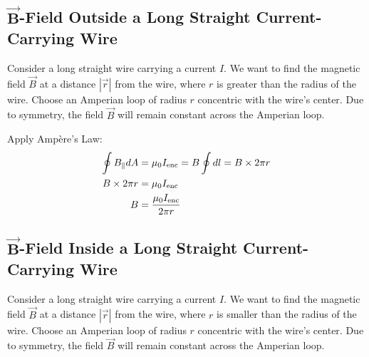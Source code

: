 \documentclass[12pt,b4paper]{article}
\begin{document}
\subsection{$\boldsymbol{\vec{B}}$-Field Outside a Long Straight Current-Carrying Wire}
Consider a long straight wire carrying a current $I$. We want to find the magnetic field $\vec{B}$ at a distance $|\vec{r}|$ from the wire, where $r$ is greater than the radius of the wire. Choose an Amperian loop of radius $r$ concentric with the wire's center. Due to symmetry, the field $\vec{B}$ will remain constant across the Amperian loop.

Apply Ampère's Law:
\begin{align}
    \oint B_\parallel dA&=\mu_0 I_\text{enc}=B\oint dl=B\times 2\pi r\notag\\
    B\times 2\pi r&=\mu_0 I_\text{enc}\notag\\
    B&=\frac{\mu_0 I_\text{enc}}{2\pi r}
\end{align}
\subsection{$\boldsymbol{\vec{B}}$-Field Inside a Long Straight Current-Carrying Wire}
Consider a long straight wire carrying a current $I$. We want to find the magnetic field $\vec{B}$ at a distance $|\vec{r}|$ from the wire, where $r$ is smaller than the radius of the wire. Choose an Amperian loop of radius $r$ concentric with the wire's center. Due to symmetry, the field $\vec{B}$ will remain constant across the Amperian loop.
\end{document}
